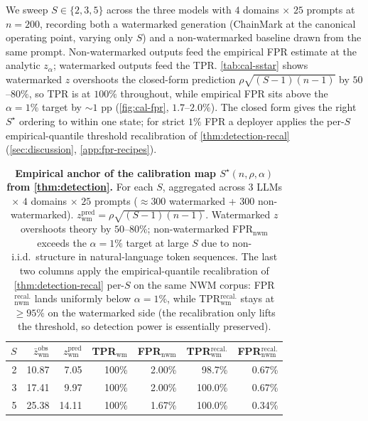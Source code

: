 We sweep $S \in \{2, 3, 5\}$ across the three models with
$4$ domains $\times$ $25$ prompts at $n{=}200$, recording both a
watermarked generation (ChainMark at the canonical operating point, varying
only $S$) and a non-watermarked baseline drawn from the same prompt.
Non-watermarked outputs feed the empirical FPR estimate at the
analytic $z_\alpha$; watermarked outputs feed the TPR.
\autoref{tab:cal-sstar} shows watermarked $z$ overshoots the
closed-form prediction $\rho\sqrt{(S{-}1)(n{-}1)}$ by $50$--$80\%$, so
TPR is at $100\%$ throughout, while empirical FPR sits above the
$\alpha=1\%$ target by $\sim\!\!1$ pp (\autoref{fig:cal-fpr},
$1.7$--$2.0\%$). The closed form gives the right $S^\star$ ordering to
within one state; for strict $1\%$ FPR a deployer applies the
per-$S$ empirical-quantile threshold recalibration of
\autoref{thm:detection-recal} (\autoref{sec:discussion},
\autoref{app:fpr-recipes}).

\begin{table}[t]
  \centering
  \caption{\textbf{Empirical anchor of the calibration map
    $S^\star(n,\rho,\alpha)$ from \autoref{thm:detection}.} For each
    $S$, aggregated across $3$ LLMs $\times$ $4$ domains $\times$ $25$
    prompts ($\approx 300$ watermarked + $300$ non-watermarked).
    $z_{\mathrm{wm}}^{\mathrm{pred}} = \rho\sqrt{(S{-}1)(n{-}1)}$.
    Watermarked $z$ overshoots theory by $50$--$80\%$;
    non-watermarked FPR$_{\mathrm{nwm}}$ exceeds the $\alpha{=}1\%$
    target at large $S$ due to non-i.i.d.\ structure in
    natural-language token sequences. The last two columns
    apply the empirical-quantile recalibration of
    \autoref{thm:detection-recal} per-$S$ on the same NWM corpus:
    FPR$_{\mathrm{nwm}}^{\mathrm{recal.}}$ lands uniformly below
    $\alpha{=}1\%$, while TPR$_{\mathrm{wm}}^{\mathrm{recal.}}$
    stays at $\geq 95\%$ on the watermarked side (the recalibration
    only lifts the threshold, so detection power is essentially
    preserved).}
  \label{tab:cal-sstar}
  \small
  \setlength{\tabcolsep}{3pt}
  \begin{tabular}{rrrrrrr}
    \toprule
    $S$ & $\bar z_{\mathrm{wm}}^{\mathrm{obs}}$
        & $z_{\mathrm{wm}}^{\mathrm{pred}}$
        & TPR$_{\mathrm{wm}}$
        & FPR$_{\mathrm{nwm}}$
        & TPR$_{\mathrm{wm}}^{\mathrm{recal.}}$
        & FPR$_{\mathrm{nwm}}^{\mathrm{recal.}}$ \\
    \midrule
    2  & 10.87 & 7.05  & 100\%   & 2.00\% & \phantom{0}98.7\% & 0.67\% \\
    3  & 17.41 & 9.97  & 100\%   & 2.00\% & 100.0\%          & 0.67\% \\
    5  & 25.38 & 14.11 & 100\%   & 1.67\% & 100.0\%          & 0.34\% \\
    \bottomrule
  \end{tabular}
\end{table}
